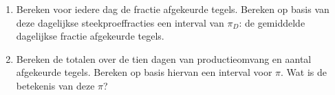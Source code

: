 \begin{enumerate}[label=(\alph*)]
    \item Bereken voor iedere dag de fractie afgekeurde tegels.
    Bereken op basis van deze dagelijkse steekproeffracties een interval van $\pi_{D}$: de gemiddelde dagelijkse fractie afgekeurde tegels.
    \answer{

    }

    \item Bereken de totalen over de tien dagen van productieomvang en aantal afgekeurde tegels.
    Bereken op basis hiervan een interval voor $\pi$.
    Wat is de betekenis van deze $\pi$?
    \answer{
        
    }
\end{enumerate}
